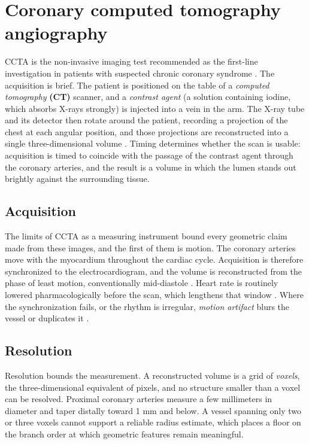 %

\section{Coronary computed tomography angiography}
\label{sec:ccta}

CCTA is the non-invasive imaging test recommended as the first-line investigation in patients with
suspected chronic coronary syndrome \cite{knuuti2019esc}. The acquisition is brief.
The patient is positioned on the table of a \emph{computed tomography} \textbf{(CT)} scanner, and a
\emph{contrast agent} (a solution containing iodine, which absorbs X-rays strongly) is
injected into a vein in the arm.
The X-ray tube and its detector then rotate around the patient, recording a projection of the chest at each angular position, and those projections are reconstructed into a single three-dimensional volume \cite{abbara2016scct}.
Timing determines whether the scan is usable: acquisition is timed to coincide with the passage of the contrast agent through the coronary arteries, and the result is a volume in which the lumen stands out brightly against the surrounding tissue.

\subsection{Acquisition}

The limits of CCTA as a measuring instrument bound every geometric claim made from these images, and the first of them is motion.
The coronary arteries move with the myocardium throughout the cardiac cycle.
Acquisition is therefore synchronized to the electrocardiogram, and the volume is reconstructed from
the phase of least motion, conventionally mid-diastole \cite{abbara2016scct}.
Heart rate is routinely lowered pharmacologically before the scan, which lengthens that window
\cite{abbara2016scct}.
Where the synchronization fails, or the rhythm is irregular, \emph{motion artifact} blurs the
vessel or duplicates it \cite{abbara2016scct}.


\subsection{Resolution}

Resolution bounds the measurement.
A reconstructed volume is a grid of \emph{voxels}, the three-dimensional equivalent of pixels, and
no structure smaller than a voxel can be resolved.
Proximal coronary arteries measure a few millimeters in diameter and taper distally toward 1 mm and
below.
A vessel spanning only two or three voxels cannot support a reliable radius estimate, which
places a floor on the branch order at which geometric features remain meaningful.
